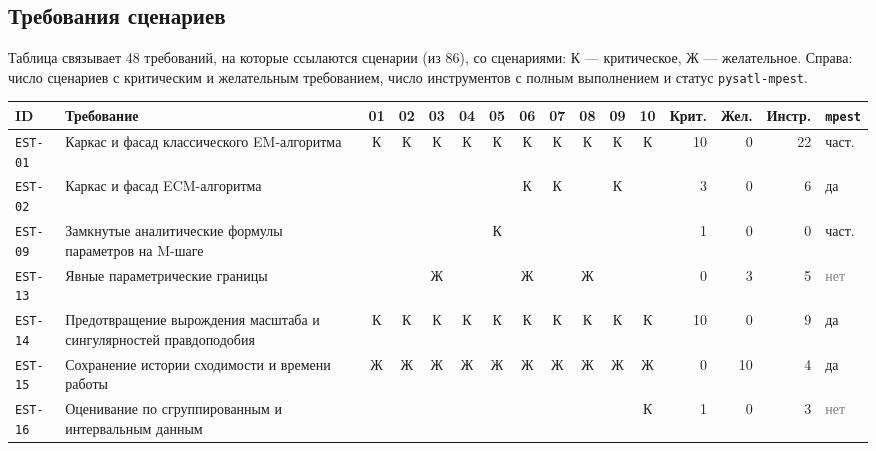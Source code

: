 \documentclass[10pt,a4paper]{article}
\begin{document}
\begin{landscape}
\section{Требования сценариев}
Таблица связывает 48 требований, на которые ссылаются сценарии (из 86), со сценариями: К --- критическое, Ж --- желательное. Справа:
число сценариев с критическим и желательным требованием, число инструментов с полным выполнением и статус \texttt{pysatl-mpest}.
{\scriptsize\setlength{\tabcolsep}{3pt}
\begin{longtable}{@{}l >{\raggedright\arraybackslash}p{8.2cm} *{10}{c} r r r l@{}}
\toprule
ID & Требование & 01 & 02 & 03 & 04 & 05 & 06 & 07 & 08 & 09 & 10 & Крит. & Жел. & Инстр. & \texttt{mpest} \\
\midrule
\endhead
\texttt{EST-01} & Каркас и фасад классического EM-алгоритма & \cellcolor{hm!70}К & \cellcolor{hm!70}К & \cellcolor{hm!70}К & \cellcolor{hm!70}К & \cellcolor{hm!70}К & \cellcolor{hm!70}К & \cellcolor{hm!70}К & \cellcolor{hm!70}К & \cellcolor{hm!70}К & \cellcolor{hm!70}К & 10 & 0 & 22 & \cellcolor{part!40}част. \\
\texttt{EST-02} & Каркас и фасад ECM-алгоритма &  &  &  &  &  & \cellcolor{hm!70}К & \cellcolor{hm!70}К &  & \cellcolor{hm!70}К &  & 3 & 0 & 6 & \cellcolor{yes!30}да \\
\texttt{EST-09} & Замкнутые аналитические формулы параметров на M-шаге &  &  &  &  & \cellcolor{hm!70}К &  &  &  &  &  & 1 & 0 & 0 & \cellcolor{part!40}част. \\
\texttt{EST-13} & Явные параметрические границы &  &  & \cellcolor{hm!22}Ж &  &  & \cellcolor{hm!22}Ж &  & \cellcolor{hm!22}Ж &  &  & 0 & 3 & 5 & \textcolor{gray}{нет} \\
\texttt{EST-14} & Предотвращение вырождения масштаба и сингулярностей правдоподобия & \cellcolor{hm!70}К & \cellcolor{hm!70}К & \cellcolor{hm!70}К & \cellcolor{hm!70}К & \cellcolor{hm!70}К & \cellcolor{hm!70}К & \cellcolor{hm!70}К & \cellcolor{hm!70}К & \cellcolor{hm!70}К & \cellcolor{hm!70}К & 10 & 0 & 9 & \cellcolor{yes!30}да \\
\texttt{EST-15} & Сохранение истории сходимости и времени работы & \cellcolor{hm!22}Ж & \cellcolor{hm!22}Ж & \cellcolor{hm!22}Ж & \cellcolor{hm!22}Ж & \cellcolor{hm!22}Ж & \cellcolor{hm!22}Ж & \cellcolor{hm!22}Ж & \cellcolor{hm!22}Ж & \cellcolor{hm!22}Ж & \cellcolor{hm!22}Ж & 0 & 10 & 4 & \cellcolor{yes!30}да \\
\texttt{EST-16} & Оценивание по сгруппированным и интервальным данным &  &  &  &  &  &  &  &  &  & \cellcolor{hm!70}К & 1 & 0 & 3 & \textcolor{gray}{нет} \\

\end{longtable}}
\end{landscape}
\end{document}
